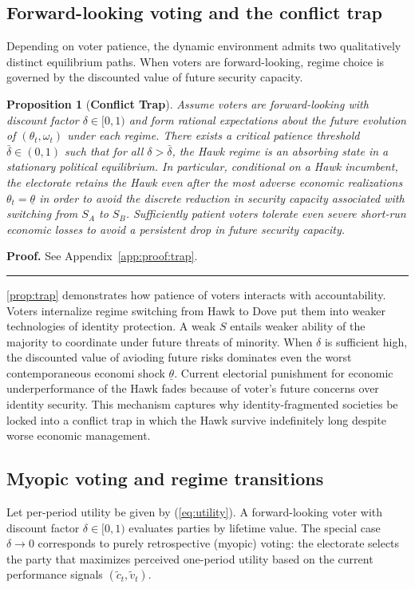 \documentclass[11pt,twoside]{extarticle}
\newtheorem{proposition}{Proposition}
\newenvironment{proof}[1][Proof]{\noindent \textbf{#1.} }{\ \rule{0.5em}{0.5em}}
\begin{document}
\subsection{Forward-looking voting and the conflict trap}
Depending on voter patience, the dynamic environment admits two qualitatively distinct equilibrium paths. When voters are forward-looking, regime choice is governed by the discounted value of future security capacity.

\begin{proposition}[\textbf{Conflict Trap}] \label{prop:trap}
Assume voters are forward-looking with discount factor $\delta\in[0,1)$ and form rational expectations about the future evolution of $(\theta_t,\omega_t)$ under each regime. There exists a critical patience threshold $\bar{\delta}\in(0,1)$ such that for all $\delta>\bar{\delta}$, the Hawk regime is an absorbing state in a stationary political equilibrium. In particular, conditional on a Hawk incumbent, the electorate retains the Hawk even after the most adverse economic realizations $\theta_t=\underline{\theta}$ in order to avoid the discrete reduction in security capacity associated with switching from $S_A$ to $S_B$.
Sufficiently patient voters tolerate even severe short-run economic losses to avoid a persistent drop in future security capacity.
\end{proposition}

\begin{proof}
See Appendix~\autoref{app:proof:trap}.
\end{proof}

\autoref{prop:trap} demonstrates how patience of voters interacts with accountability. Voters internalize regime switching from Hawk to Dove put them into weaker technologies of identity protection. A weak $S$ entails weaker ability of the majority to coordinate under future threats of minority. When $\delta$ is sufficient high, the discounted value of avioding future risks dominates even the worst contemporaneous economi shock $\underline{\theta}$. Current electorial punishment for economic underperformance of the Hawk fades because of voter's future concerns over identity security. This mechanism captures why identity-fragmented societies be locked into a conflict trap in which the Hawk survive indefinitely long despite worse economic management.

\subsection{Myopic voting and regime transitions}
Let per-period utility be given by (\ref{eq:utility}). A forward-looking voter with discount factor $\delta\in[0,1)$ evaluates parties by lifetime value. The special case $\delta\to 0$ corresponds to purely retrospective (myopic) voting: the electorate selects the party that maximizes perceived one-period utility based on the current performance signals $(\tilde{c}_t,\tilde{v}_t)$.
\end{document}
